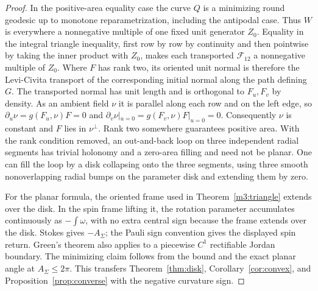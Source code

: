 \documentclass[11pt,reqno]{amsart}
\theoremstyle{definition}
\theoremstyle{remark}
\numberwithin{equation}{section}
\begin{document}
\begin{proof}
In the positive-area equality case the curve \(Q\) is a minimizing
round geodesic up to monotone reparametrization, including the
antipodal case. Thus \(W\) is everywhere a nonnegative multiple
of one fixed unit generator \(Z_0\). Equality in the integral
triangle inequality, first row by row by continuity and then
pointwise by taking the inner product with \(Z_0\), makes each
transported \(\mathcal F_{12}\) a nonnegative multiple of \(Z_0\).
Where \(F\) has rank two, its oriented unit normal is therefore
the Levi-Civita transport of the corresponding initial normal
along the path defining \(G\). The transported normal has unit
length and is orthogonal to \(F_u,F_v\) by density. As an ambient
field \(\nu\) it is parallel along each row and on the left edge,
so \(\partial_u\nu=g(F_u,\nu)F=0\) and
\(\partial_v\nu|_{u=0}=g(F_v,\nu)F|_{u=0}=0\).
Consequently \(\nu\) is constant and \(F\) lies in \(\nu^\perp\).
Rank two somewhere guarantees positive area. With the rank
condition removed, an out-and-back loop on three independent
radial segments has trivial holonomy and a zero-area filling
and need not be planar. One can fill the loop by a disk collapsing
onto the three segments, using three smooth nonoverlapping
radial bumps on the parameter disk and extending them by zero.

For the planar formula, the oriented frame used in
Theorem~\ref{m3:triangle} extends over the disk. In the spin frame
lifting it, the rotation parameter accumulates continuously as
\(-\int\omega\), with no extra central sign because the frame
extends over the disk. Stokes gives \(-A_\Sigma\); the Pauli
sign convention gives the displayed spin return. Green's theorem
also applies to a piecewise \(C^1\) rectifiable Jordan boundary.
The minimizing claim follows from the bound and the exact
planar angle at \(A_\Sigma\le2\pi\). This transfers
Theorem~\ref{thm:disk}, Corollary~\ref{cor:convex}, and
Proposition~\ref{prop:converse} with the negative curvature sign.
\end{proof}
\end{document}
